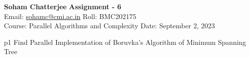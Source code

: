 \documentclass[a4paper, 11pt]{article}
\begin{document}
	
	
\textsf{\noindent \large\textbf{Soham Chatterjee} \hfill \textbf{Assignment - 6}\\
	Email: \href{sohamc@cmi.ac.in}{sohamc@cmi.ac.in} \hfill Roll: BMC202175\\
	\normalsize Course: Parallel Algorithms and Complexity \hfill Date: September 2, 2023}
	
	
\begin{problem}{%
	}{p1%
	}
Find Parallel Implementation of Boruvka's Algorithm of Minimum Spanning Tree
		
\end{problem}
	
\end{document}
